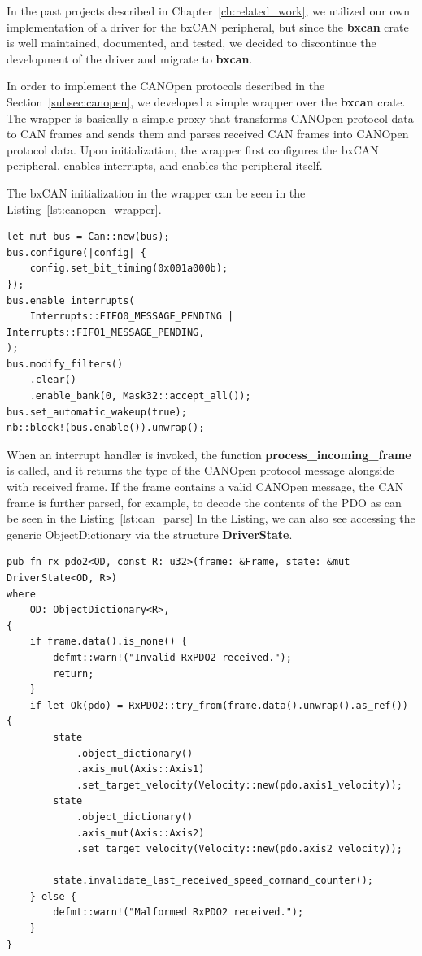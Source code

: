 In the past projects described in Chapter~\ref{ch:related_work}, we utilized our own implementation of a driver for the bxCAN peripheral, but since the \textbf{bxcan} crate is well maintained, documented, and tested, we decided to discontinue the development of the driver and migrate to \textbf{bxcan}.

In order to implement the CANOpen protocols described in the Section~\ref{subsec:canopen}, we developed a simple wrapper over the \textbf{bxcan} crate.
The wrapper is basically a simple proxy that transforms CANOpen protocol data to CAN frames and sends them and parses received CAN frames into CANOpen protocol data.
Upon initialization, the wrapper first configures the bxCAN peripheral, enables interrupts, and enables the peripheral itself.

The bxCAN initialization in the wrapper can be seen in the Listing~\ref{lst:canopen_wrapper}.
\newpage
\begin{lstlisting}[caption={Initializing the bxCAN peripheral in the CANOpen wrapper.},label=lst:canopen_wrapper]
let mut bus = Can::new(bus);
bus.configure(|config| {
    config.set_bit_timing(0x001a000b);
});
bus.enable_interrupts(
    Interrupts::FIFO0_MESSAGE_PENDING | Interrupts::FIFO1_MESSAGE_PENDING,
);
bus.modify_filters()
    .clear()
    .enable_bank(0, Mask32::accept_all());
bus.set_automatic_wakeup(true);
nb::block!(bus.enable()).unwrap();
\end{lstlisting}

When an interrupt handler is invoked, the function \textbf{process\_incoming\_frame} is called, and it returns the type of the CANOpen protocol message alongside with received frame.
If the frame contains a valid CANOpen message, the CAN frame is further parsed, for example, to decode the contents of the PDO as can be seen in the Listing~\ref{lst:can_parse}
In the Listing, we can also see accessing the generic ObjectDictionary via the structure \textbf{DriverState}.
\newpage
\begin{lstlisting}[caption={Accessing the Object Dictionary when a RxPDO2 is received.},label=lst:can_parse]
pub fn rx_pdo2<OD, const R: u32>(frame: &Frame, state: &mut DriverState<OD, R>)
where
    OD: ObjectDictionary<R>,
{
    if frame.data().is_none() {
        defmt::warn!("Invalid RxPDO2 received.");
        return;
    }
    if let Ok(pdo) = RxPDO2::try_from(frame.data().unwrap().as_ref()) {
        state
            .object_dictionary()
            .axis_mut(Axis::Axis1)
            .set_target_velocity(Velocity::new(pdo.axis1_velocity));
        state
            .object_dictionary()
            .axis_mut(Axis::Axis2)
            .set_target_velocity(Velocity::new(pdo.axis2_velocity));

        state.invalidate_last_received_speed_command_counter();
    } else {
        defmt::warn!("Malformed RxPDO2 received.");
    }
}
\end{lstlisting}

